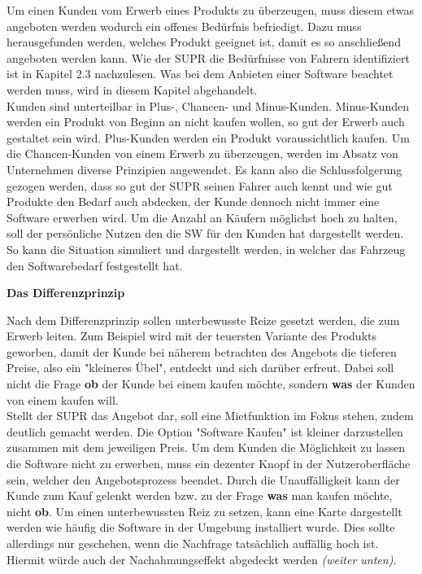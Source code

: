 Um einen Kunden vom Erwerb eines Produkts zu überzeugen, muss diesem etwas angeboten werden wodurch ein offenes Bedürfnis befriedigt. Dazu muss herausgefunden werden, welches Produkt geeignet ist, damit es so anschließend angeboten werden kann. Wie der SUPR die Bedürfnisse von Fahrern identifiziert ist in Kapitel 2.3 nachzulesen. Was bei dem Anbieten einer Software beachtet werden muss, wird in diesem Kapitel abgehandelt.\\
Kunden sind unterteilbar in Plus-, Chancen- und Minus-Kunden.\cite[S. 10ff.]{vkPsy} Minus-Kunden werden ein Produkt von Beginn an nicht kaufen wollen, so gut der Erwerb auch gestaltet sein wird. Plus-Kunden werden ein Produkt voraussichtlich kaufen. Um die Chancen-Kunden von einem Erwerb zu überzeugen, werden im Absatz von Unternehmen diverse Prinzipien angewendet. Es kann also die Schlussfolgerung gezogen werden, dass so gut der SUPR seinen Fahrer auch kennt und wie gut Produkte den Bedarf auch abdecken, der Kunde dennoch nicht immer eine Software erwerben wird. Um die Anzahl an Käufern möglichst hoch zu halten, soll der persönliche Nutzen den die SW für den Kunden hat dargestellt werden. So kann die Situation simuliert und dargestellt werden, in welcher das Fahrzeug den Softwarebedarf festgestellt hat.\\
\label{angebotserstellung}
\begin{large}
	\textbf{Das Differenzprinzip}\cite[S. 19fff.]{vkPsy}\\
\end{large}
Nach dem Differenzprinzip sollen unterbewusste Reize gesetzt werden, die zum Erwerb leiten. Zum Beispiel wird mit der teuersten Variante des Produkts geworben, damit der Kunde bei näherem betrachten des Angebots die tieferen Preise, also ein "kleineres Übel", entdeckt und sich darüber erfreut. Dabei soll nicht die Frage \textbf{ob} der Kunde bei einem kaufen möchte, sondern \textbf{was} der Kunden von einem kaufen will.\\
Stellt der SUPR das Angebot dar, soll eine Mietfunktion im Fokus stehen, zudem deutlich gemacht werden. Die Option "Software Kaufen" ist kleiner darzustellen zusammen mit dem jeweiligen Preis. Um dem Kunden die Möglichkeit zu lassen die Software nicht zu erwerben, muss ein dezenter Knopf in der Nutzeroberfläche sein, welcher den Angebotsprozess beendet. Durch die Unauffälligkeit kann der Kunde zum Kauf gelenkt werden bzw. zu der Frage \textbf{was} man kaufen möchte, nicht \textbf{ob}. Um einen unterbewussten Reiz zu setzen, kann eine Karte dargestellt werden wie häufig die Software in der Umgebung installiert wurde. Dies sollte allerdings nur geschehen, wenn die Nachfrage tatsächlich auffällig hoch ist. Hiermit würde auch der Nachahmungseffekt abgedeckt werden\textit{ (weiter unten)}.\\

